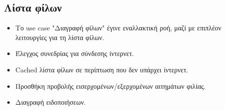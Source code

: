 \subsection{Λίστα φίλων}
\begin{itemize}
    \item Το use case "Διαγραφή φίλων" έγινε εναλλακτική ροή, μαζί με επιπλέον λειτουργίες για τη λίστα φίλων.
    \item Έλεγχος συνεδρίας για σύνδεσης ίντερνετ.
    \item Cached λίστα φίλων σε περίπτωση που δεν υπάρχει ίντερνετ.
	\item Προσθήκη προβολής εισερχομένων/εξερχομένων αιτημάτων φιλίας.
	\item Διαγραφή ειδοποιήσεων.
\end{itemize}


\clearpage
